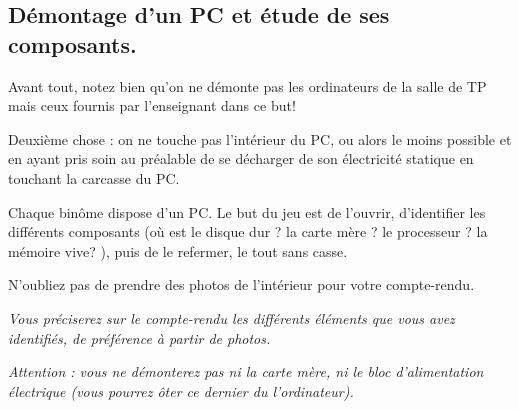 \subsection{Démontage d'un PC et étude de ses composants.}\label{sec.demontage}

Avant tout, notez bien qu'on ne démonte pas les ordinateurs de la
salle de TP mais ceux fournis par l'enseignant dans ce but!

Deuxième chose : on ne touche pas l'intérieur du PC, ou alors le moins
possible et  en ayant pris  soin au préalable  de se décharger  de son
électricité statique en touchant la carcasse du PC.

Chaque  binôme  dispose  d'un PC.  Le  but  du  jeu est  de  l'ouvrir,
d'identifier  les différents  composants (où  est le  disque dur ? la
carte mère ? le processeur ?  la mémoire vive? ), puis de le refermer,
le tout sans casse.

N'oubliez pas de prendre des photos de l'intérieur pour votre
compte-rendu.

\emph{Vous préciserez sur le compte-rendu les différents éléments
  que vous avez identifiés, de préférence à partir de photos.}

\emph{Attention : vous ne démonterez pas ni la carte mère, ni le bloc d'alimentation électrique (vous pourrez ôter ce dernier du l'ordinateur).}  
